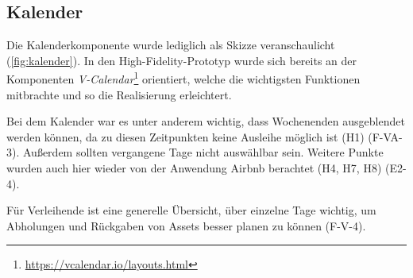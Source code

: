 \subsection{Kalender}
Die Kalenderkomponente wurde lediglich als Skizze veranschaulicht (\ref{fig:kalender}). In den High-Fidelity-Prototyp
wurde sich bereits an der Komponenten \textit{V-Calendar}\footnote{\url{https://vcalendar.io/layouts.html}}
orientiert, welche die wichtigsten Funktionen mitbrachte und so die Realisierung erleichtert.

Bei dem Kalender war es unter anderem wichtig, dass Wochenenden ausgeblendet werden können, da zu
diesen Zeitpunkten keine Ausleihe möglich ist (H1) (F-VA-3). Außerdem sollten vergangene Tage nicht
auswählbar sein. Weitere Punkte wurden auch hier wieder von der Anwendung Airbnb berachtet (H4, H7,
H8) (E2-4). 

Für Verleihende ist eine generelle Übersicht, über einzelne Tage wichtig, um Abholungen und
Rückgaben von Assets besser planen zu können (F-V-4). 

